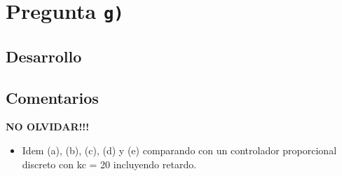 \section{Pregunta \texttt{g)}}\label{pregunta-g}


\subsection{Desarrollo}


\FloatBarrier
\subsection{Comentarios}

\textbf{NO OLVIDAR!!!}


\begin{itemize}
  \item Idem (a), (b), (c), (d) y (e) comparando con un controlador proporcional discreto con kc = 20 incluyendo retardo.
\end{itemize}

